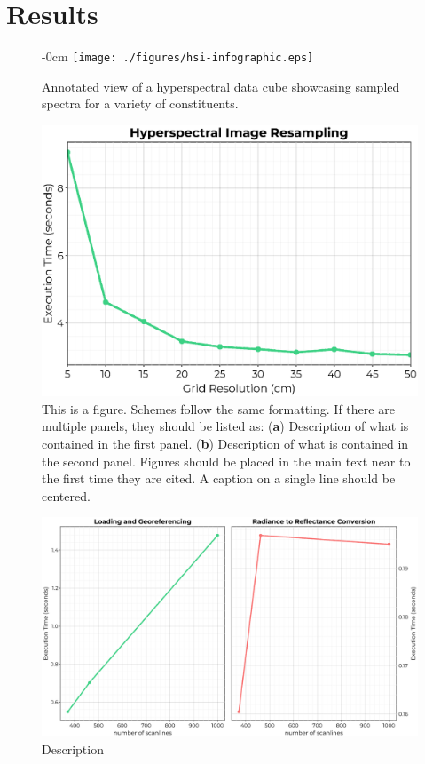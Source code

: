 \documentclass[remotesensing,article,submit,pdftex,moreauthors]{Definitions/mdpi}
\begin{document}
\section{Results}

\begin{figure}[H]
    \begin{adjustwidth}{-\extralength}{0cm}
        \centering
        \texttt{[image: ./figures/hsi-infographic.eps]}
    \end{adjustwidth}
    \caption{Annotated view of a hyperspectral data cube showcasing sampled spectra for a variety of constituents.\label{fig:hsi-infographic}}
\end{figure}  


\begin{figure}[H]
    \includegraphics[width=10.5 cm]{./figures/regrid-timing.eps}
\caption{This is a figure. Schemes follow the same formatting. If there are multiple panels, they should be listed as: (\textbf{a}) Description of what is contained in the first panel. (\textbf{b}) Description of what is contained in the second panel. Figures should be placed in the main text near to the first time they are cited. A caption on a single line should be centered.\label{fig-regridding-timing}}
\end{figure}

\begin{figure}[H]
  \includegraphics[width=10.5 cm]{./figures/reflectance-timing.eps}
  \caption{Description \label{fig-reflectance-timing}}
\end{figure}
\end{document}
